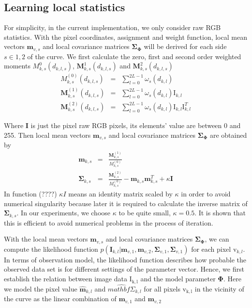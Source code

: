 \subsection{Learning local statistics}
\label{sec:lls}

For simplicity, in the current implementation, we only consider raw RGB
statistics. With the pixel coordinates, assignment and weight
function, local mean vectors $\mathbf{m}_{v,s}$  and local covariance matrices
$\mathbf{\Sigma}_{\mathbf{\Phi}}$ will be derived for each side $s \in
{1,2}$ of the curve.
We first calculate the zero, first and second order weighted moments
$M_{k,s}^0(d_{k,l,s})$, $\mathbf{M}_{k,s}^1(d_{k,l,s})$ and $\mathbf{M}_{k,s}^2(d_{k,l,s})$
\begin{eqnarray}
  \label{eq:5.13}
  M_{k,s}^{(0)}(d_{k,l,s}) &=& \sum_{l=0}^{2L-1} \omega_s(d_{k,l})\\
  \mathbf{M}_{k,s}^{(1)}(d_{k,l,s}) &=& \sum_{l=0}^{2L-1} \omega_s(d_{k,l}) \mathrm{I}_{k,l}\\
  \mathbf{M}_{k,s}^{(2)}(d_{k,l,s}) &=& \sum_{l=0}^{2L-1} \omega_s(d_{k,l}) \mathrm{I}_{k,l}\mathrm{I}_{k,l}^T
\end{eqnarray}

Where $\mathbf{I}$ is just the pixel raw RGB pixels, its elements'
value are between 0 and 255. Then local mean vectors $\mathbf{m}_{v,s}$  and local covariance matrices
$\mathbf{\Sigma}_{\mathbf{\Phi}}$  are obtained by 
\begin{eqnarray}
  \label{eq:5.14}
  \mathbf{m}_{k,s} &=& \frac{\mathbf{M}^{(1)}_{k,s}}{M^{(0)}_{k,s}}\\
  \mathbf{\Sigma}_{k,s} &=& \frac{\mathbf{M}^{(2)}_{k,s}}{M^{(0)}_{k,s}}
  - \mathbf{m}_{k,s}\mathbf{m}_{k,s}^T  + \kappa \mathbf{I}
\end{eqnarray}
In function (????) $\kappa I$  means an identity matrix scaled by
$\kappa$ in order to avoid numerical singularity because later it is
required to calculate the inverse matrix of
$\mathbf{\Sigma}_{k,s}$. In our experiments, we choose $\kappa$ to be
quite small, $\kappa = 0.5$. It is shown that this is efficient to
avoid numerical problems in the process of iteration.

With the local mean vectors $\mathbf{m}_{v,s}$  and local covariance matrices
$\mathbf{\Sigma}_{\mathbf{\Phi}}$, we can compute the
likelihood function   $p(\mathbf{I}_{k,l} | \mathbf{m}_{v,1}, \mathbf{m}_{v,2},
  \mathbf{\Sigma}_{v,1}, \mathbf{\Sigma}_{v,1})$ for each pixel
  $\mathrm{v}_{k,l}$. In terms of observation model, the likelihood
  function describes how probable the observed data set is for
  different settings of the parameter vector. Hence, we first establish
  the relation between image data $\mathrm{I_{k,l}}$ and the model
  parameter $\mathbf{\Phi}$. Here we model the pixel value
  $\hat{\mathbf{m}}_{k,l}$ and $\hat{mathbf{\Sigma}}_{k,l}$
  for all pixels $\mathrm{v_{k,l}}$ in the vicinity of the curve as the
  linear combination of $\mathbf{m}_{v,1}$ and $\mathbf{m}_{v,2}$

